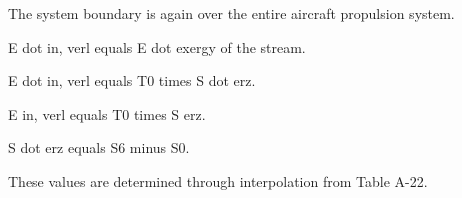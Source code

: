 The system boundary is again over the entire aircraft propulsion system.  

E dot in, verl equals E dot exergy of the stream.  

E dot in, verl equals T0 times S dot erz.  

E in, verl equals T0 times S erz.  

S dot erz equals S6 minus S0.  

These values are determined through interpolation from Table A-22.